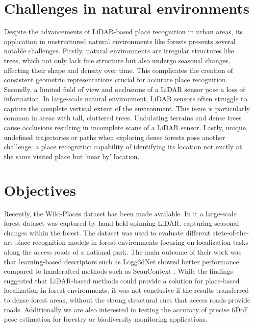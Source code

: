 \section{Challenges in natural environments}
Despite the advancements of LiDAR-based place recognition in urban areas, its application in unstructured natural environments like forests presents several notable challenges. 
Firstly, natural environments are irregular structures like trees, which not only lack fine structure but also undergo seasonal changes, affecting their shape and density over time. This complicates the creation of consistent geometric representations crucial for accurate place recognition.
Secondly, a limited field of view and occlusions of a LiDAR sensor pose a loss of information. In large-scale natural environment, LiDAR sensors often struggle to capture the complete vertical extent of the environment. 
This issue is particularly common in areas with tall, cluttered trees.  Undulating terrains and dense trees cause occlusions resulting in incomplete scans of a LiDAR sensor. 
Lastly, unique, undefined trajectories or paths when exploring dense forests pose another challenge: a place recognition capability of identifying its location not exctly at the same visited place but 'near by' location. 


\section{Objectives}
Recently, the Wild-Places dataset \cite{knights2023icra} has been made available. In it a large-scale forest dataset was captured by hand-held spinning LiDAR, capturing seasonal changes within the forest. The dataset was used to evaluate different stete-of-the-art place recognition models in forest environments focusing on localization tasks along the access roads of a national park. The main outcome of their work was that learning-based descriptors such as Logg3dNet \cite{vidanapathirana2022icra} showed better performance compared to handcrafted methods such as ScanContext \cite{kim2018iros}. While the findings suggested that LiDAR-based methods could provide a solution for place-based localization in forest environments, it was not conclusive if the results transferred to dense forest areas, without the strong structural cues that access roads provide roads. Additionally we are also interested in testing the accuracy of precise 6DoF pose estimation for forestry or biodiversity monitoring applications.



